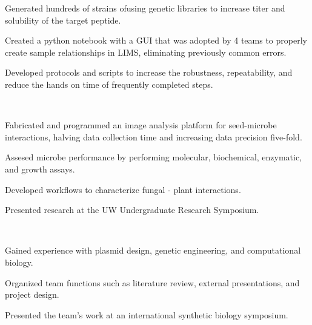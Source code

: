 \documentclass[]{forrest-resume-interfont}
\begin{document}
\begin{tightemize}
    \item Generated hundreds of strains ofusing genetic libraries to increase titer and solubility of the target peptide. \vspace{-3pt}
    \item Created a python notebook with a GUI that was adopted by 4 teams to properly create sample relationships in LIMS, eliminating previously common errors.
    \item Developed protocols and scripts to increase the robustness, repeatability, and reduce the hands on time of frequently completed steps.
\end{tightemize}

\spacesep

\\

\begin{tightemize}
    \item Fabricated and programmed an image analysis platform for seed-microbe interactions, halving data collection time and increasing data precision five-fold.
    \item Assesed microbe performance by performing molecular, biochemical, enzymatic, and growth assays.
   \item Developed workflows to characterize fungal - plant interactions.
    \item Presented research at the UW Undergraduate Research Symposium.
\end{tightemize}

\\

\begin{tightemize}
    \item Gained experience with plasmid design, genetic engineering, and computational biology.
    \item Organized team functions such as literature review, external presentations, and project design.
    \item Presented the team's work at an international synthetic biology symposium.
\end{tightemize}
\end{document}
